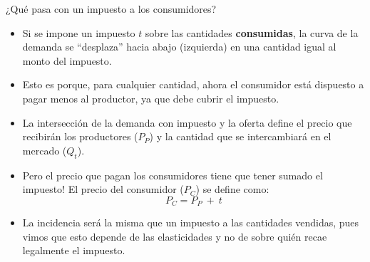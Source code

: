 \documentclass{beamer}
\begin{document}
\begin{frame}{¿Qué pasa con un impuesto a los consumidores?}
    \begin{itemize}
        \item Si se impone un impuesto $t$ sobre las cantidades \textbf{consumidas}, la curva de la demanda se ``desplaza'' hacia abajo (izquierda) en una cantidad igual al monto del impuesto.
        \item Esto es porque, para cualquier cantidad, ahora el consumidor está dispuesto a pagar menos al productor, ya que debe cubrir el impuesto.
        \item La intersección de la demanda con impuesto y la oferta define el precio que recibirán los productores ($P_P$) y la cantidad que se intercambiará en el mercado ($Q_t$).
        \item Pero el precio que pagan los consumidores tiene que tener sumado el impuesto! El precio del consumidor ($P_C$) se define como:
          \[ P_C=P_P\ + \ t\] 
          \vspace{-8mm}
         \item La incidencia será la misma que un impuesto a las cantidades vendidas, pues vimos que esto depende de las elasticidades y no de sobre quién recae legalmente el impuesto. 
    \end{itemize}
\end{frame}
\end{document}
